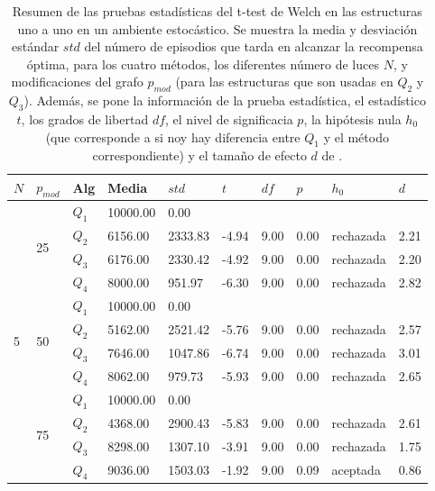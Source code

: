 \clearpage

\begin{table}[]
\centering
\caption{Resumen de las pruebas estadísticas del t-test de Welch en las
estructuras uno a uno en un ambiente estocástico. Se muestra la media y desviación estándar $std$ del número 
de episodios que tarda en alcanzar la recompensa óptima, para los cuatro métodos, los diferentes número de luces $N$, y modificaciones del grafo $p_{mod}$ (para las estructuras que son usadas en $Q_2$ y $Q_3$). Además, se pone la información
de la prueba estadística, el estadístico $t$, los grados de libertad $df$, el nivel
de significacia $p$, la hipótesis nula $h_0$ (que corresponde a si noy hay diferencia entre $Q_1$ y el método correspondiente) y el tamaño de efecto $d$ de \citet{cohen2013statistical}.}
\label{tab:one-to-one-pmod-sto}
\begin{tabular}{|l|l|l|l|l|l|l|l|l|l|}
\hline
$N$ & $p_{mod}$ & Alg & Media & $std$ & $t$ & $df$ & $p$ & $h_0$ & $d$ \\ \hline
\multirow{12}{*}{5} & \multirow{4}{*}{25} & $Q_1$ & 10000.00 & 0.00 & \multicolumn{5}{l|}{} \\ \cline{3-10} 
 &  & $Q_2$ & 6156.00 & 2333.83 & -4.94 & 9.00 & 0.00 & rechazada & 2.21 \\ \cline{3-10} 
 &  & $Q_3$ & 6176.00 & 2330.42 & -4.92 & 9.00 & 0.00 & rechazada & 2.20 \\ \cline{3-10} 
 &  & $Q_4$ & 8000.00 & 951.97 & -6.30 & 9.00 & 0.00 & rechazada & 2.82 \\ \cline{2-10} 
 & \multirow{4}{*}{50} & $Q_1$ & 10000.00 & 0.00 & \multicolumn{5}{l|}{} \\ \cline{3-10} 
 &  & $Q_2$ & 5162.00 & 2521.42 & -5.76 & 9.00 & 0.00 & rechazada & 2.57 \\ \cline{3-10} 
 &  & $Q_3$ & 7646.00 & 1047.86 & -6.74 & 9.00 & 0.00 & rechazada & 3.01 \\ \cline{3-10} 
 &  & $Q_4$ & 8062.00 & 979.73 & -5.93 & 9.00 & 0.00 & rechazada & 2.65 \\ \cline{2-10} 
 & \multirow{4}{*}{75} & $Q_1$ & 10000.00 & 0.00 & \multicolumn{5}{l|}{} \\ \cline{3-10} 
 &  & $Q_2$ & 4368.00 & 2900.43 & -5.83 & 9.00 & 0.00 & rechazada & 2.61 \\ \cline{3-10} 
 &  & $Q_3$ & 8298.00 & 1307.10 & -3.91 & 9.00 & 0.00 & rechazada & 1.75 \\ \cline{3-10} 
 &  & $Q_4$ & 9036.00 & 1503.03 & -1.92 & 9.00 & 0.09 & aceptada & 0.86 \\ \hline

\end{tabular}
\end{table}
